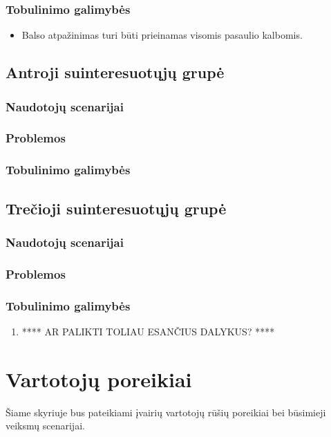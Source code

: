\documentclass{VUMIFPSkursinis}
\begin{document}
\subsubsection{Tobulinimo galimybės}
\begin{itemize}
\item Balso atpažinimas turi būti prieinamas visomis pasaulio kalbomis.
\end{itemize}

\subsection{Antroji suinteresuotųjų grupė}

\subsubsection{Naudotojų scenarijai}
\subsubsection{Problemos}
\subsubsection{Tobulinimo galimybės}

\subsection{Trečioji suinteresuotųjų grupė}

\subsubsection{Naudotojų scenarijai}
\subsubsection{Problemos}
\subsubsection{Tobulinimo galimybės}
\begin{enumerate}[label*=\arabic*.]
\item **** AR PALIKTI TOLIAU ESANČIUS DALYKUS? ****
\end{enumerate}


\section{Vartotojų poreikiai}
Šiame skyriuje bus pateikiami įvairių vartotojų rūšių poreikiai bei būsimieji veiksmų scenarijai.
\end{document}
